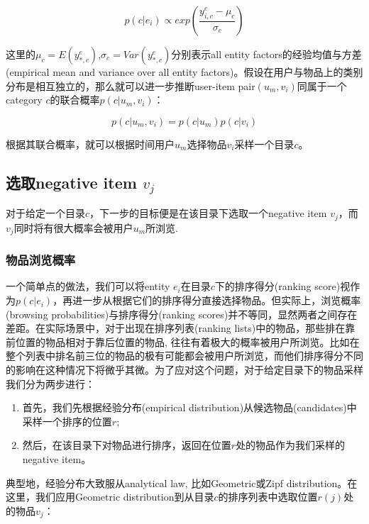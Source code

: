 \begin{equation}
p\left(c|e_i\right)  \propto exp\left( \frac {y_{i,c}^e - \mu_c}{\sigma_c} \right)
\end{equation}

这里的$\mu_c = E\left(y_{*,c}^e\right)$,$\sigma_c = Var\left(y_{*,c}^e\right)$分别表示all entity factors的经验均值与方差(empirical mean and variance over all entity factors)。假设在用户与物品上的类别分布是相互独立的，那么就可以进一步推断user-item pair$\left(u_m,v_i\right)$同属于一个category $c$的联合概率$p\left(c|u_m,v_i\right)$：

\begin{equation}
\label{eq21}
p\left(c|u_m,v_i\right) = p\left(c|u_m\right)p\left(c|v_i\right)
\end{equation}

根据其联合概率，就可以根据时间用户$u_m$选择物品$v_i$采样一个目录$c$。




\subsection{选取negative item $v_j$}
对于给定一个目录$c$，下一步的目标便是在该目录下选取一个negative item $v_j$，而$v_j$同时将有很大概率会被用户$u_m$所浏览. 

\subsubsection{物品浏览概率}
一个简单点的做法，我们可以将entity $e_i$在目录$c$下的排序得分(ranking score)视作为$p\left(c|e_i\right)$，再进一步从根据它们的排序得分直接选择物品。但实际上，浏览概率(browsing probabilities)与排序得分(ranking scores)并不等同，显然两者之间存在差距。在实际场景中，对于出现在排序列表(ranking lists)中的物品，那些排在靠前位置的物品相对于靠后位置的物品, 往往有着极大的概率被用户所浏览。比如在整个列表中排名前三位的物品的极有可能都会被用户所浏览，而他们排序得分不同的影响在这种情况下将微乎其微。为了应对这个问题，对于给定目录下的物品采样我们分为两步进行：
\begin{enumerate}
	\item 首先，我们先根据经验分布(empirical distribution)从候选物品(candidates)中采样一个排序的位置$r$;
	\item 然后，在该目录下对物品进行排序，返回在位置$r$处的物品作为我们采样的negative item。
\end{enumerate} 

典型地，经验分布大致服从analytical law, 比如Geometric\cite{wang2009pskip}或Zipf\cite{adamic2002zipf} distribution。在这里，我们应用Geometric distribution到从目录$c$的排序列表中选取位置$r(j)$处的物品$v_j$：

